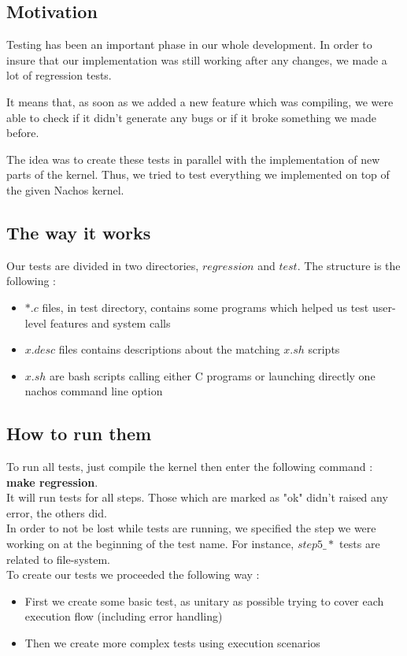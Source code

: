 \subsection{Motivation}
Testing has been an important phase in our whole development. In order to insure
that our implementation was still working after any changes, we made a lot of
regression tests. 

It means that, as soon as we added a new feature which was compiling, we were
able to check if it didn't generate any bugs or if it broke something we made before.

The idea was to create these tests in parallel with the implementation of new
parts of the kernel. Thus, we tried to test everything we implemented on top of
the given Nachos kernel.

\subsection{The way it works}
Our tests are divided in two directories, $regression$ and $test$. The
structure is the following :
\begin{itemize}
    \item $*.c$ files, in test directory, contains some programs which helped us
        test user-level features and system calls
    \item $x.desc$ files contains descriptions about the matching $x.sh$ scripts
    \item $x.sh$ are bash scripts calling either C programs or launching directly
        one nachos command line option
\end{itemize}


\subsection{How to run them}
To run all tests, just compile the kernel then enter the following command :
\textbf{make regression}.\\

It will run tests for all steps. Those which are marked as "ok" didn't raised
any error, the others did.\\

In order to not be lost while tests are running, we specified the step we were
working on at the beginning of the test name. For instance, $step5\_*$ tests are
related to file-system.\\

To create our tests we proceeded the following way :
\begin{itemize}
    \item First we create some basic test, as unitary as possible trying to
        cover each execution flow (including error handling)
    \item Then we create more complex tests using execution scenarios
\end{itemize}

